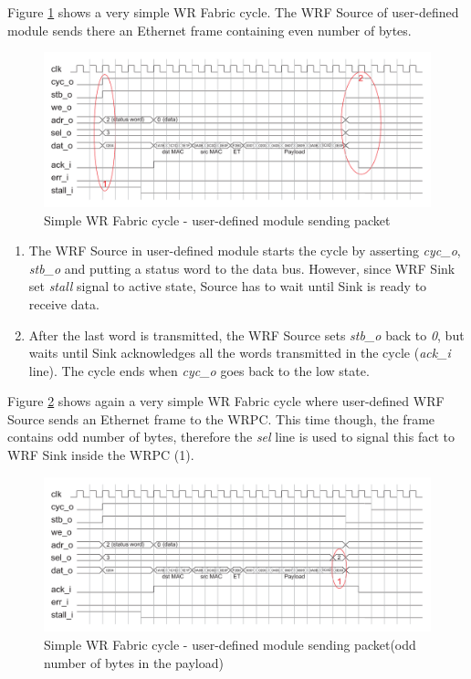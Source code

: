 Figure \ref{fig:fabric:simple_tx} shows a very simple WR Fabric cycle. The WRF
Source of user-defined module sends there an Ethernet frame containing even
number of bytes.

\begin{figure}
  \begin{center}
    \includegraphics[width=\textwidth]{fig/basic_wrf_cycle_simple.pdf}
    \caption{Simple WR Fabric cycle - user-defined module sending packet}
    \label{fig:fabric:simple_tx}
  \end{center}
\end{figure}

\begin{enumerate}
  \item The WRF Source in user-defined module starts the cycle by asserting
    \emph{cyc\_o}, \emph{stb\_o} and putting a status word to the data bus.
    However, since WRF Sink set \emph{stall} signal to active state, Source has
    to wait until Sink is ready to receive data.
  \item After the last word is transmitted, the WRF Source sets \emph{stb\_o} back
    to \emph{0}, but waits until Sink acknowledges all the words transmitted in
    the cycle (\emph{ack\_i} line). The cycle ends when \emph{cyc\_o} goes back
    to the low state.
\end{enumerate}

Figure \ref{fig:fabric:sel} shows again a very simple WR Fabric cycle where
user-defined WRF Source sends an Ethernet frame to the WRPC. This time though,
the frame contains odd number of bytes, therefore the \emph{sel} line is used to
signal this fact to WRF Sink inside the WRPC (1).

\begin{figure}
  \begin{center}
    \includegraphics[width=\textwidth]{fig/basic_wrf_cycle_sel.pdf}
    \caption{Simple WR Fabric cycle - user-defined module sending packet(odd
    number of bytes in the payload)}
    \label{fig:fabric:sel}
  \end{center}
\end{figure}


